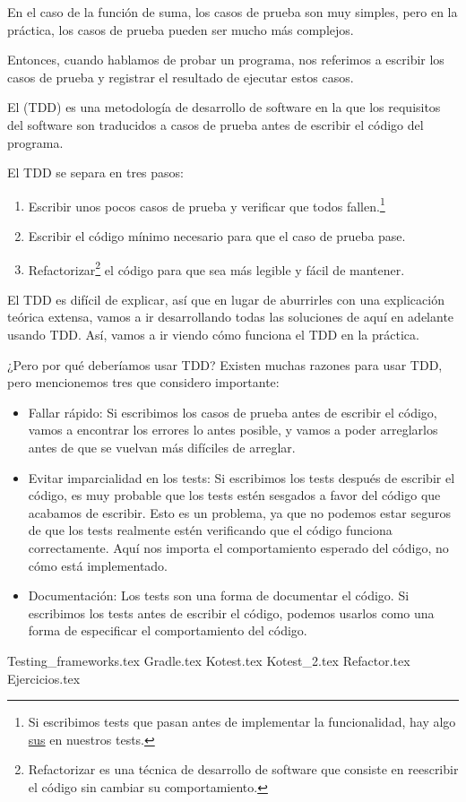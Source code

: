   En el caso de la función de suma, los casos de prueba son muy simples, pero en la práctica, los
  casos de prueba pueden ser mucho más complejos.

  Entonces, cuando hablamos de probar un programa, nos referimos a escribir los casos de prueba y
  registrar el resultado de ejecutar estos casos.

  \begin{defaultbox}
    El  (TDD) es una metodología de desarrollo de software en la que
    los requisitos del software son traducidos a casos de prueba antes de escribir el código del
    programa.
  \end{defaultbox}

  El TDD se separa en tres pasos:

  \begin{enumerate}
    \item Escribir unos pocos casos de prueba y verificar que todos fallen.\footnote{
        Si escribimos tests que pasan antes de implementar la funcionalidad, hay algo 
        \href{https://www.merriam-webster.com/words-at-play/what-does-sus-mean}{sus} en nuestros 
        tests.
      }
    \item Escribir el código mínimo necesario para que el caso de prueba pase.
    \item Refactorizar\footnote{
      Refactorizar es una técnica de desarrollo de software que consiste en reescribir el código sin 
      cambiar su comportamiento.
    } el código para que sea más legible y fácil de mantener.
  \end{enumerate}

  El TDD es difícil de explicar, así que en lugar de aburrirles con una explicación teórica extensa,
  vamos a ir desarrollando todas las soluciones de aquí en adelante usando TDD.
  Así, vamos a ir viendo cómo funciona el TDD en la práctica.

  ¿Pero por qué deberíamos usar TDD?
  Existen muchas razones para usar TDD, pero mencionemos tres que considero importante:

  \begin{itemize}
    \item Fallar rápido: Si escribimos los casos de prueba antes de escribir el código, vamos a
      encontrar los errores lo antes posible, y vamos a poder arreglarlos antes de que se vuelvan
      más difíciles de arreglar.
    \item Evitar imparcialidad en los tests: Si escribimos los tests después de escribir el código,
      es muy probable que los tests estén sesgados a favor del código que acabamos de escribir.
      Esto es un problema, ya que no podemos estar seguros de que los tests realmente estén
      verificando que el código funciona correctamente.
      Aquí nos importa el comportamiento esperado del código, no cómo está implementado.
    \item Documentación: Los tests son una forma de documentar el código.
      Si escribimos los tests antes de escribir el código, podemos usarlos como una forma de
      especificar el comportamiento del código.
  \end{itemize}

  {Testing_frameworks.tex}
  {Gradle.tex}
  {Kotest.tex}
  {Kotest_2.tex}
  {Refactor.tex}
  {Ejercicios.tex}
  \printbibliography[keyword=tdd]